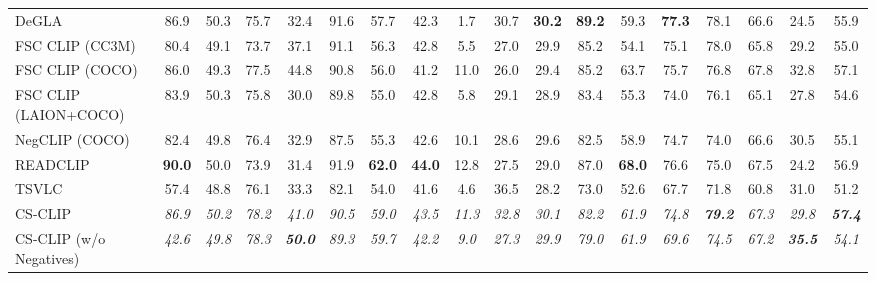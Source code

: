 \begin{table}[t]
\begin{adjustbox}{max width=\textwidth}
\begin{tabular}{lccccccccccccccccc}
    DeGLA & 86.9 & 50.3 & 75.7 & 32.4 & 91.6 & 57.7 & 42.3 & 1.7 & 30.7 & \textbf{30.2} & \textbf{89.2} & 59.3 & \textbf{77.3} & 78.1 & 66.6 & 24.5 & 55.9 \\
    FSC CLIP (CC3M) & 80.4 & 49.1 & 73.7 & 37.1 & 91.1 & 56.3 & 42.8 & 5.5 & 27.0 & 29.9 & 85.2 & 54.1 & 75.1 & 78.0 & 65.8 & 29.2 & 55.0 \\
    FSC CLIP (COCO) & 86.0 & 49.3 & 77.5 & 44.8 & 90.8 & 56.0 & 41.2 & 11.0 & 26.0 & 29.4 & 85.2 & 63.7 & 75.7 & 76.8 & 67.8 & 32.8 & 57.1 \\
    FSC CLIP (LAION+COCO) & 83.9 & 50.3 & 75.8 & 30.0 & 89.8 & 55.0 & 42.8 & 5.8 & 29.1 & 28.9 & 83.4 & 55.3 & 74.0 & 76.1 & 65.1 & 27.8 & 54.6 \\
    NegCLIP (COCO) & 82.4 & 49.8 & 76.4 & 32.9 & 87.5 & 55.3 & 42.6 & 10.1 & 28.6 & 29.6 & 82.5 & 58.9 & 74.7 & 74.0 & 66.6 & 30.5 & 55.1 \\
    READCLIP & \textbf{90.0} & 50.0 & 73.9 & 31.4 & 91.9 & \textbf{62.0} & \textbf{44.0} & 12.8 & 27.5 & 29.0 & 87.0 & \textbf{68.0} & 76.6 & 75.0 & 67.5 & 24.2 & 56.9 \\
    TSVLC & 57.4 & 48.8 & 76.1 & 33.3 & 82.1 & 54.0 & 41.6 & 4.6 & 36.5 & 28.2 & 73.0 & 52.6 & 67.7 & 71.8 & 60.8 & 31.0 & 51.2 \\
    \midrule
    CS-CLIP & \emph{86.9} & \emph{50.2} & \emph{78.2} & \emph{41.0} & \emph{90.5} & \emph{59.0} & \emph{43.5} & \emph{11.3} & \emph{32.8} & \emph{30.1} & \emph{82.2} & \emph{61.9} & \emph{74.8} & \emph{\textbf{79.2}} & \emph{67.3} & \emph{29.8} & \emph{\textbf{57.4}} \\
    CS-CLIP (w/o Negatives) & \emph{42.6} & \emph{49.8} & \emph{78.3} & \emph{\textbf{50.0}} & \emph{89.3} & \emph{59.7} & \emph{42.2} & \emph{9.0} & \emph{27.3} & \emph{29.9} & \emph{79.0} & \emph{61.9} & \emph{69.6} & \emph{74.5} & \emph{67.2} & \emph{\textbf{35.5}} & \emph{54.1} \\
    \bottomrule
  \end{tabular}
  \end{adjustbox}
\end{table}

